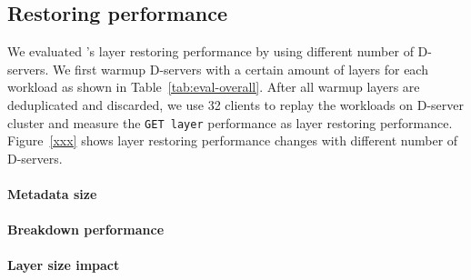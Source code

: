 \subsection{Restoring performance}

We evaluated \sysname's layer restoring performance by using different number of D-servers.
We first warmup D-servers with a certain amount of layers for each workload as shown in Table~\ref{tab:eval-overall}.
After all warmup layers are deduplicated and discarded,
we use 32 clients to replay the workloads on D-server cluster 
and measure the \texttt{GET layer} performance as layer restoring performance.
Figure~\ref{xxx} shows layer restoring performance changes with different number of D-servers.


\paragraph{Metadata size}



\paragraph{Breakdown performance}



\paragraph{Layer size impact}

